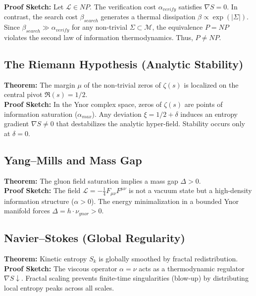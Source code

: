 \documentclass[12pt,a4paper]{article}
\begin{document}
\textbf{Proof Sketch:} Let $\mathcal{L} \in NP$. The verification cost $\alpha_{verify}$ satisfies $\nabla S = 0$. In contrast, the search cost $\beta_{search}$ generates a thermal dissipation $\beta \propto \exp(|\Sigma|)$. Since $\beta_{search} \gg \alpha_{verify}$ for any non-trivial $\Sigma \subset \mathcal{M}$, the equivalence $P=NP$ violates the second law of information thermodynamics. Thus, $P \neq NP$.



\subsection{The Riemann Hypothesis (Analytic Stability)}

\textbf{Theorem:} The margin $\mu$ of the non-trivial zeros of $\zeta(s)$ is localized on the central pivot $\Re(s) = 1/2$. \\

\textbf{Proof Sketch:} In the Ynor complex space, zeros of $\zeta(s)$ are points of information saturation ($\alpha_{max}$). Any deviation $\xi = 1/2 + \delta$ induces an entropy gradient $\nabla S \neq 0$ that destabilizes the analytic hyper-field. Stability occurs only at $\delta = 0$.



\subsection{Yang--Mills and Mass Gap}

\textbf{Theorem:} The gluon field saturation implies a mass gap $\Delta > 0$. \\

\textbf{Proof Sketch:} The field $\mathcal{L} = -\frac{1}{4} F_{\mu\nu} F^{\mu\nu}$ is not a vacuum state but a high-density information structure ($\alpha > 0$). The energy minimalization in a bounded Ynor manifold forces $\Delta = h \cdot \nu_{ynor} > 0$.



\subsection{Navier--Stokes (Global Regularity)}

\textbf{Theorem:} Kinetic entropy $S_k$ is globally smoothed by fractal redistribution. \\

\textbf{Proof Sketch:} The viscous operator $\alpha = \nu$ acts as a thermodynamic regulator $\nabla S \downarrow$. Fractal scaling prevents finite-time singularities (blow-up) by distributing local entropy peaks across all scales.
\end{document}
